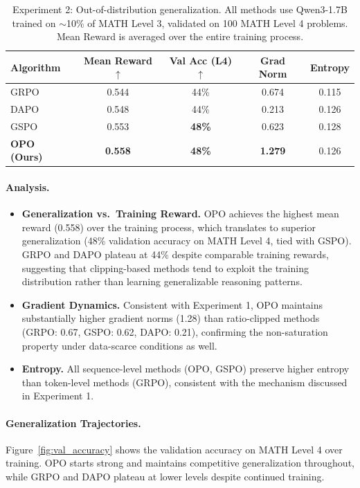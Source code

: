 \documentclass[11pt]{article}
\theoremstyle{definition}
\theoremstyle{remark}
\begin{document}
\begin{table}[htbp]
\centering
\caption{Experiment 2: Out-of-distribution generalization. All methods use Qwen3-1.7B trained on $\sim$10\% of MATH Level 3, validated on 100 MATH Level 4 problems. Mean Reward is averaged over the entire training process.}
\label{tab:generalization}
\begin{tabular}{lcccc}
\toprule
\textbf{Algorithm} & \textbf{Mean Reward}$\uparrow$ & \textbf{Val Acc (L4)}$\uparrow$ & \textbf{Grad Norm} & \textbf{Entropy} \\
\midrule
GRPO & 0.544 & 44\% & 0.674 & 0.115 \\
DAPO & 0.548 & 44\% & 0.213 & 0.126 \\
GSPO & 0.553 & \textbf{48\%} & 0.623 & 0.128 \\
\textbf{OPO (Ours)} & \textbf{0.558} & \textbf{48\%} & \textbf{1.279} & 0.126 \\
\bottomrule
\end{tabular}
\end{table}

\paragraph{Analysis.}
\begin{itemize}
    \item \textbf{Generalization vs.\ Training Reward.} OPO achieves the highest mean reward (0.558) over the training process, which translates to superior generalization (48\% validation accuracy on MATH Level 4, tied with GSPO). GRPO and DAPO plateau at 44\% despite comparable training rewards, suggesting that clipping-based methods tend to exploit the training distribution rather than learning generalizable reasoning patterns.
    \item \textbf{Gradient Dynamics.} Consistent with Experiment 1, OPO maintains substantially higher gradient norms (1.28) than ratio-clipped methods (GRPO: 0.67, GSPO: 0.62, DAPO: 0.21), confirming the non-saturation property under data-scarce conditions as well.
    \item \textbf{Entropy.} All sequence-level methods (OPO, GSPO) preserve higher entropy than token-level methods (GRPO), consistent with the mechanism discussed in Experiment 1.
\end{itemize}

\paragraph{Generalization Trajectories.} Figure~\ref{fig:val_accuracy} shows the validation accuracy on MATH Level 4 over training. OPO starts strong and maintains competitive generalization throughout, while GRPO and DAPO plateau at lower levels despite continued training.
\end{document}

